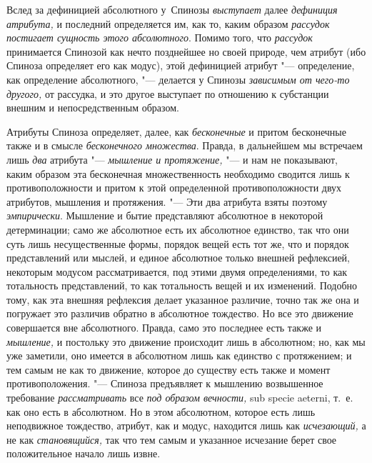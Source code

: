 Вслед за дефиницией абсолютного у~Спинозы
{\em выступает} далее
{\em дефиниция атрибута,} и последний определяется им,
как то, каким образом {\em рассудок постигает сущность
этого
абсолютного}.
Помимо того, что {\em рассудок} принимается Спинозой
как нечто позднейшее но своей природе, чем атрибут (ибо Спиноза определяет
его как модус), этой дефиницией атрибут "--- определение, как определение
абсолютного, "--- делается у Спинозы {\em зависимым от
чего-то другого,} от рассудка, и это другое выступает по отношению к
субстанции внешним и непосредственным образом.

Атрибуты Спиноза определяет, далее, как
{\em бесконечные} и притом бесконечные также и в смысле
{\em бесконечного множества}. Правда, в дальнейшем мы
встречаем лишь {\em два} атрибута
"--- {\em мышление и протяжение,} "--- и нам не показывают,
каким образом эта бесконечная множественность необходимо сводится лишь к
противоположности и притом к этой определенной противоположности двух
атрибутов, мышления и протяжения. "--- Эти два атрибута взяты поэтому
{\em эмпирически}. Мышление и бытие представляют
абсолютное в некоторой детерминации; само же абсолютное есть их абсолютное
единство, так что они суть лишь несущественные формы, порядок вещей есть
тот же, что и порядок представлений или мыслей, и единое абсолютное только
внешней рефлексией, некоторым модусом рассматривается, под этими двумя
определениями, то как тотальность представлений, то как тотальность вещей и
их изменений. Подобно тому, как эта внешняя рефлексия делает указанное
различие, точно так же она и погружает это различив обратно в абсолютное
тождество. Но все это движение совершается вне абсолютного. Правда, само
это последнее есть также и {\em мышление,} и постольку
это движение происходит лишь в абсолютном; но, как мы уже заметили, оно
имеется в абсолютном лишь как единство с протяжением; и тем самым не как то
движение, которое до существу есть также и момент противоположения. "---
Спиноза предъявляет к мышлению возвышенное требование
{\em рассматривать} все {\em под
образом вечности,} sub specie aeterni, т.~е. как оно есть в абсолютном. Но
в этом абсолютном, которое есть лишь неподвижное тождество, атрибут, как и
модус, находится лишь как {\em исчезающий,} а не как
{\em становящийся,} так что тем самым и указанное
исчезание берет свое положительное начало лишь извне.

